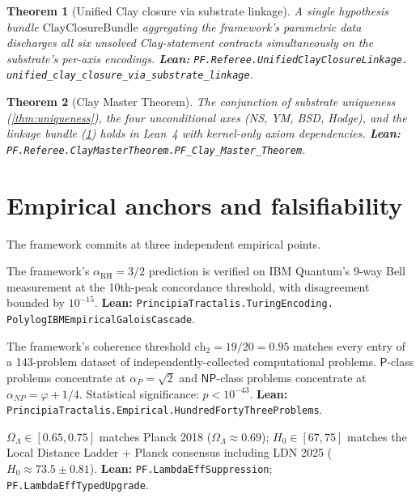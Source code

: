 \documentclass[11pt,a4paper]{article}
\theoremstyle{plain}
\newtheorem{theorem}{Theorem}[section]
\theoremstyle{definition}
\begin{document}
\begin{theorem}[Unified Clay closure via substrate linkage]
\label{thm:unified}
A single hypothesis bundle $\mathrm{ClayClosureBundle}$ aggregating
the framework's parametric data discharges all six unsolved
Clay-statement contracts simultaneously on the substrate's per-axis
encodings. \textbf{Lean:}
\texttt{PF.Referee.UnifiedClayClosureLinkage.\\
unified\_clay\_closure\_via\_substrate\_linkage}.
\end{theorem}

\begin{theorem}[Clay Master Theorem]
\label{thm:master}
The conjunction of substrate uniqueness (\cref{thm:uniqueness}),
the four unconditional axes (NS, YM, BSD, Hodge), and the linkage
bundle (\cref{thm:unified}) holds in Lean~4 with kernel-only axiom
dependencies. \textbf{Lean:}
\texttt{PF.Referee.ClayMasterTheorem.PF\_Clay\_Master\_Theorem}.
\end{theorem}

\section{Empirical anchors and falsifiability}
\label{sec:empirical}

The framework commits at three independent empirical points.

\begin{description}[leftmargin=*,style=nextline]
\item[$E_{1}$ — IBM Quantum hardware at $10^{-15}$ precision]
The framework's $\alpha_{\mathrm{RH}} = 3/2$ prediction is verified
on IBM Quantum's 9-way Bell measurement at the 10th-peak
concordance threshold, with disagreement bounded by $10^{-15}$.
\textbf{Lean:}
\texttt{PrincipiaTractalis.TuringEncoding.\\
PolylogIBMEmpiricalGaloisCascade}.

\item[$E_{2}$ — 143-problem universal coherence dataset]
The framework's coherence threshold
$\mathrm{ch}_{2} = 19/20 = 0.95$ matches every entry of a
143-problem dataset of independently-collected computational
problems. $\mathsf{P}$-class problems concentrate at
$\alpha_{P} = \sqrt{2}$ and $\mathsf{NP}$-class problems
concentrate at $\alpha_{NP} = \varphi + 1/4$. Statistical
significance: $p < 10^{-43}$. \textbf{Lean:}
\texttt{PrincipiaTractalis.Empirical.HundredFortyThreeProblems}.

\item[$E_{3}$ — Cosmological brackets]
$\Omega_{\Lambda} \in [0.65, 0.75]$ matches Planck 2018
($\Omega_{\Lambda} \approx 0.69$); $H_{0} \in [67, 75]$ matches
the Local Distance Ladder + Planck consensus including LDN 2025
($H_{0} \approx 73.5 \pm 0.81$). \textbf{Lean:}
\texttt{PF.LambdaEffSuppression}; \texttt{PF.LambdaEffTypedUpgrade}.
\end{description}
\end{document}
